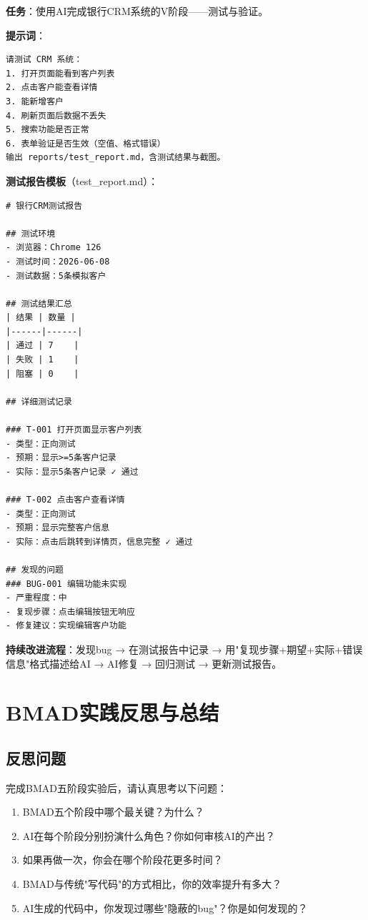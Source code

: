 \begin{practicebox}[用AI生成测试报告]
\textbf{任务}：使用AI完成银行CRM系统的V阶段——测试与验证。

\textbf{提示词}：

\begin{lstlisting}
请测试 CRM 系统：
1. 打开页面能看到客户列表
2. 点击客户能查看详情
3. 能新增客户
4. 刷新页面后数据不丢失
5. 搜索功能是否正常
6. 表单验证是否生效（空值、格式错误）
输出 reports/test_report.md，含测试结果与截图。
\end{lstlisting}

\textbf{测试报告模板}（test\_report.md）：

\begin{lstlisting}[style=markdown]
# 银行CRM测试报告

## 测试环境
- 浏览器：Chrome 126
- 测试时间：2026-06-08
- 测试数据：5条模拟客户

## 测试结果汇总
| 结果 | 数量 |
|------|------|
| 通过 | 7    |
| 失败 | 1    |
| 阻塞 | 0    |

## 详细测试记录

### T-001 打开页面显示客户列表
- 类型：正向测试
- 预期：显示>=5条客户记录
- 实际：显示5条客户记录 ✓ 通过

### T-002 点击客户查看详情
- 类型：正向测试
- 预期：显示完整客户信息
- 实际：点击后跳转到详情页，信息完整 ✓ 通过

## 发现的问题
### BUG-001 编辑功能未实现
- 严重程度：中
- 复现步骤：点击编辑按钮无响应
- 修复建议：实现编辑客户功能
\end{lstlisting}

\textbf{持续改进流程}：发现bug → 在测试报告中记录 → 用"复现步骤+期望+实际+错误信息"格式描述给AI → AI修复 → 回归测试 → 更新测试报告。
\end{practicebox}

\section{BMAD实践反思与总结}

\subsection{反思问题}

完成BMAD五阶段实验后，请认真思考以下问题：

\begin{enumerate}[leftmargin=2em]
  \item BMAD五个阶段中哪个最关键？为什么？
  \item AI在每个阶段分别扮演什么角色？你如何审核AI的产出？
  \item 如果再做一次，你会在哪个阶段花更多时间？
  \item BMAD与传统"写代码"的方式相比，你的效率提升有多大？
  \item AI生成的代码中，你发现过哪些"隐蔽的bug"？你是如何发现的？
\end{enumerate}

